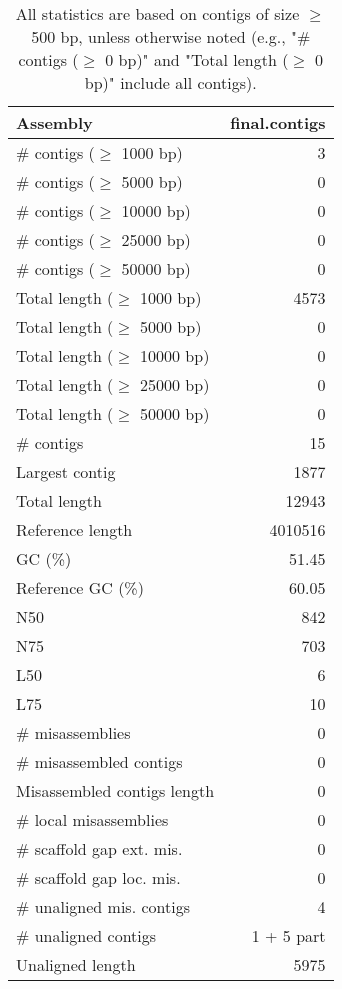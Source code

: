 \documentclass[12pt,a4paper]{article}
\begin{document}
\begin{table}[ht]
\begin{center}
\caption{All statistics are based on contigs of size $\geq$ 500 bp, unless otherwise noted (e.g., "\# contigs ($\geq$ 0 bp)" and "Total length ($\geq$ 0 bp)" include all contigs).}
\begin{tabular}{|l*{1}{|r}|}
\hline
Assembly & final.contigs \\ \hline
\# contigs ($\geq$ 1000 bp) & 3 \\ \hline
\# contigs ($\geq$ 5000 bp) & 0 \\ \hline
\# contigs ($\geq$ 10000 bp) & 0 \\ \hline
\# contigs ($\geq$ 25000 bp) & 0 \\ \hline
\# contigs ($\geq$ 50000 bp) & 0 \\ \hline
Total length ($\geq$ 1000 bp) & 4573 \\ \hline
Total length ($\geq$ 5000 bp) & 0 \\ \hline
Total length ($\geq$ 10000 bp) & 0 \\ \hline
Total length ($\geq$ 25000 bp) & 0 \\ \hline
Total length ($\geq$ 50000 bp) & 0 \\ \hline
\# contigs & 15 \\ \hline
Largest contig & 1877 \\ \hline
Total length & 12943 \\ \hline
Reference length & 4010516 \\ \hline
GC (\%) & 51.45 \\ \hline
Reference GC (\%) & 60.05 \\ \hline
N50 & 842 \\ \hline
N75 & 703 \\ \hline
L50 & 6 \\ \hline
L75 & 10 \\ \hline
\# misassemblies & 0 \\ \hline
\# misassembled contigs & 0 \\ \hline
Misassembled contigs length & 0 \\ \hline
\# local misassemblies & 0 \\ \hline
\# scaffold gap ext. mis. & 0 \\ \hline
\# scaffold gap loc. mis. & 0 \\ \hline
\# unaligned mis. contigs & 4 \\ \hline
\# unaligned contigs & 1 + 5 part \\ \hline
Unaligned length & 5975 \\ \hline

\end{tabular}
\end{center}
\end{table}
\end{document}
